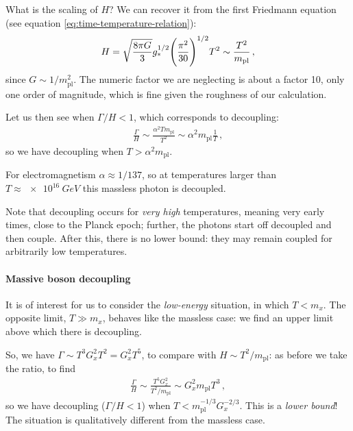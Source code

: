 \documentclass[main.tex]{subfiles}
\begin{document}
What is the scaling of \(H\)? We can recover it from the first Friedmann equation (see equation \eqref{eq:time-temperature-relation}):
%
\begin{align}
  H = \sqrt{\frac{8 \pi G }{3}} g_{*}^{1/2} \qty(\frac{\pi^2}{30})^{1/2} T^2 \sim \frac{T^2}{m _{\text{pl}}}
\,,
\end{align}
%
since \(G \sim 1/m _{\text{pl}}^2\). The numeric factor we are neglecting is about a factor 10, only one order of magnitude, which is fine given the roughness of our calculation. 

Let us then see when \(\Gamma / H < 1\), which corresponds to decoupling:
%
\begin{align}
  \frac{\Gamma}{H} \sim \frac{\alpha^2 T m _{\text{pl}}}{T^2} \sim \alpha^2 m _{\text{pl}} \frac{1}{T}
\,,
\end{align}
%
so we have decoupling when \(T > \alpha^2 m _{\text{pl}}\).

For electromagnetism \(\alpha \approx 1 / 137\), so at temperatures larger than \(T \approx \SI{e16}{GeV}\) this massless photon is decoupled.

Note that decoupling occurs for \emph{very high} temperatures, meaning very early times, close to the Planck epoch; further, the photons start off decoupled and then couple. 
After this, there is no lower bound: they may remain coupled for arbitrarily low temperatures. 




\paragraph{Massive boson decoupling}

It is of interest for us to consider the \emph{low-energy} situation, in which \(T < m_x\).
The opposite limit, \(T \gg m_x\), behaves like the massless case: we find an upper limit above which there is decoupling. 

So, we have \(\Gamma \sim T^3 G_x^2 T^2 = G_x^2 T^{5}\), to compare with \(H \sim T^2/ m _{\text{pl}}\): as before we take the ratio, to find 
%
\begin{align}
  \frac{\Gamma}{H} \sim \frac{T^5 G_x^2}{T^2 / m _{\text{pl}}} \sim G_x^2 m _{\text{pl}} T^3 
\,,
\end{align}
%
so we have decoupling (\(\Gamma / H < 1\)) when \(T < m _{\text{pl}}^{-1/3} G_x^{-2/3}\). 
This is a \emph{lower bound}! The situation is qualitatively different from the massless case. 
\end{document}
